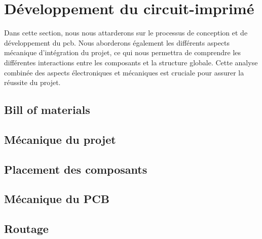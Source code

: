 \section{Développement du circuit-imprimé} \label{sec:Dev-PCB}
Dans cette section, nous nous attarderons sur le processus de conception et de développement du \gls{pcb}. Nous aborderons également les différents aspects mécanique d'intégration du projet, ce qui nous permettra de comprendre les différentes interactions entre les composants et la structure globale. Cette analyse combinée des aspects électroniques et mécaniques est cruciale pour assurer la réussite du projet.

\subsection{Bill of materials} \label{ssec:BOM}

\subsection{Mécanique du projet} \label{ssec:mechProjet}

\subsection{Placement des composants} \label{ssec:placementComp}

\subsection{Mécanique du PCB} \label{ssec:Mech-PCB}

\subsection{Routage} \label{ssec:routage}

